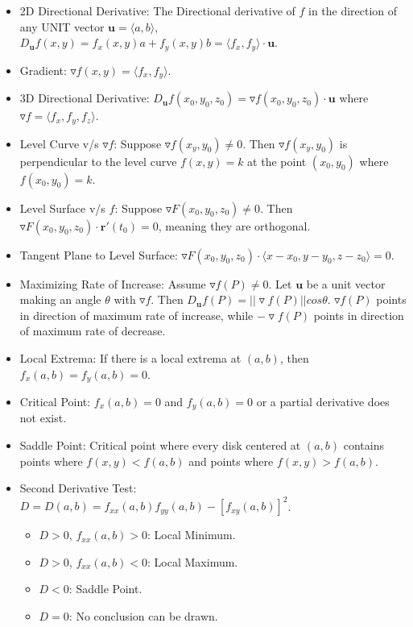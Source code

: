 \documentclass[10pt, portrait]{article}
\begin{document}
\begin{multicols*}{2}
\begin{itemize}
    \item 2D Directional Derivative: The Directional derivative of $f$ in the direction of any UNIT vector $\bm{u}=\langle a,b \rangle$, $D_{\bm{u}}f(x,y)=f_x(x,y)a+f_y(x,y)b=\langle f_x,f_y\rangle \cdot \bm{u}$.
    \item Gradient: $\triangledown f(x,y)=\langle f_x,f_y\rangle$.
    \item 3D Directional Derivative: $D_{\bm{u}}f(x_0,y_0,z_0)=\triangledown f(x_0,y_0,z_0) \cdot \bm{u}$ where $\triangledown f=\langle f_x,f_y,f_z \rangle$.
    \item Level Curve v/s $\triangledown f$: Suppose $\triangledown f(x_y,y_0)\neq0$. Then $\triangledown f(x_y,y_0)$ is perpendicular to the level curve $f(x,y)=k$ at the point $(x_0,y_0)$ where $f(x_0,y_0)=k$.
    \item Level Surface v/s $f$: Suppose $\triangledown F(x_0,y_0,z_0)\neq0$. Then $\triangledown F(x_0,y_0,z_0)\cdot\bm{r}'(t_0)=0$, meaning they are orthogonal.
    \item Tangent Plane to Level Surface: $\triangledown F(x_0,y_0,z_0)\cdot\langle x-x_0,y-y_0,z-z_0\rangle=0$.
    \item Maximizing Rate of Increase: Assume $\triangledown f(P)\neq0$. Let $\bm{u}$ be a unit vector making an angle $\theta$ with $\triangledown f$. Then $D_{\bm{u}} f(P)=||\triangledown f(P)||cos\theta$. $\triangledown f(P)$ points in direction of maximum rate of increase, while $-\triangledown f(P)$ points in direction of maximum rate of decrease.
    \item Local Extrema: If there is a local extrema at $(a,b)$, then $f_x(a,b)=f_y(a,b)=0$.
    \item Critical Point: $f_x(a,b)=0$ and $f_y(a,b)=0$ or a partial derivative does not exist.
    \item Saddle Point: Critical point where every disk centered at $(a,b)$ contains points where $f(x,y)<f(a,b)$ and points where $f(x,y)>f(a,b)$.
    \item Second Derivative Test: $D=D(a,b)=f_{xx}(a,b)f_{yy}(a,b)-[f_{xy}(a,b)]^2$.
    \begin{itemize}
        \item $D>0$, $f_{xx}(a,b)>0$: Local Minimum.
        \item $D>0$, $f_{xx}(a,b) < 0$: Local Maximum.
        \item $D<0$: Saddle Point.
        \item $D=0$: No conclusion can be drawn.
    \end{itemize}
\end{itemize}


\end{multicols*}
\end{document}
